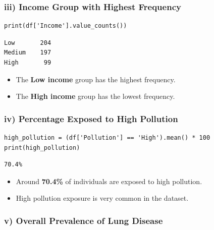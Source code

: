 \documentclass[12pt,a4paper]{article}
\begin{document}
\subsubsection{iii) Income Group with Highest Frequency}

\begin{lstlisting}
print(df['Income'].value_counts())
\end{lstlisting}

\begin{outputbox}
\begin{verbatim}
Low       204
Medium    197
High       99
\end{verbatim}
\end{outputbox}

\begin{interpbox}
\begin{itemize}[noitemsep]
  \item The \textbf{Low income} group has the highest frequency.
  \item The \textbf{High income} group has the lowest frequency.
\end{itemize}
\end{interpbox}

\subsubsection{iv) Percentage Exposed to High Pollution}

\begin{lstlisting}
high_pollution = (df['Pollution'] == 'High').mean() * 100
print(high_pollution)
\end{lstlisting}

\begin{outputbox}
\begin{verbatim}
70.4%
\end{verbatim}
\end{outputbox}

\begin{interpbox}
\begin{itemize}[noitemsep]
  \item Around \textbf{70.4\%} of individuals are exposed to high pollution.
  \item High pollution exposure is very common in the dataset.
\end{itemize}
\end{interpbox}

\subsubsection{v) Overall Prevalence of Lung Disease}
\end{document}
